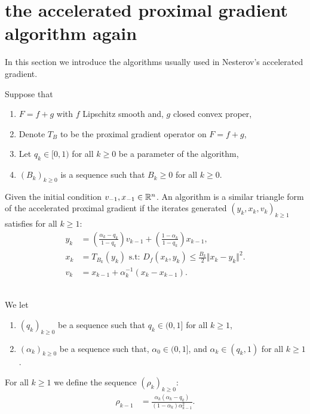 \documentclass[12pt]{article}
\begin{document}
\section{the accelerated proximal gradient algorithm again}
    In this section we introduce the algorithms usually used in Nesterov's accelerated gradient. 
    \begin{definition}\label{def:st-form}
        Suppose that 
        \begin{enumerate}
            \item $F = f + g$ with $f$ Lipschitz smooth and, $g$ closed convex proper, 
            \item Denote $T_B$ to be the proximal gradient operator on $F = f + g$, 
            \item Let $q_k \in [0, 1)$ for all $k \ge 0$ be a parameter of the algorithm, 
            \item $(B_k)_{k \ge 0}$ is a sequence such that $B_k \ge 0$ for all $k \ge 0$. 
        \end{enumerate}
        Given the initial condition $v_{-1}, x_{-1} \in \mathbb R^n$. 
        An algorithm is a similar triangle form of the accelerated proximal gradient if the iterates generated $(y_k, x_k, v_k)_{k \ge 1}$ satisfies for all $k \ge 1$: 
        \begin{align*}
            y_k &= \left(\frac{\alpha_k - q_k}{1 - q_k}\right)v_{k - 1} 
            + \left(\frac{1 - \alpha_k}{1 - q_k}\right) x_{k - 1},
            \\
            x_k &= T_{B_k}(y_k) \text{ s.t: } D_f(x_k, y_k) \le \frac{B_k}{2}\Vert x_k - y_k\Vert^2. 
            \\
            v_k &= x_{k - 1} + \alpha_k^{-1}(x_k - x_{k - 1}). 
        \end{align*}
    \end{definition}
    \begin{definition}\;\label{def:r-nes-seq}\\
        We let 
        \begin{enumerate}
            \item $(q_k)_{k \ge 0}$ be a sequence such that $q_k \in (0, 1]$ for all $k \ge 1$, 
            \item $(\alpha_k)_{k \ge 0}$ be a sequence such that, $\alpha_0 \in (0, 1]$, and $\alpha_k \in (q_k, 1)$ for all $k \ge 1$. 
        \end{enumerate}
        For all $k \ge 1$ we define the sequence $(\rho_k)_{k \ge 0}$: 
        \begin{align*}
            \rho_{k - 1} &= \frac{\alpha_k(\alpha_k - q_k)}{(1 - \alpha_{k})\alpha_{k - 1}^2}. 
        \end{align*}
    \end{definition}
\end{document}
